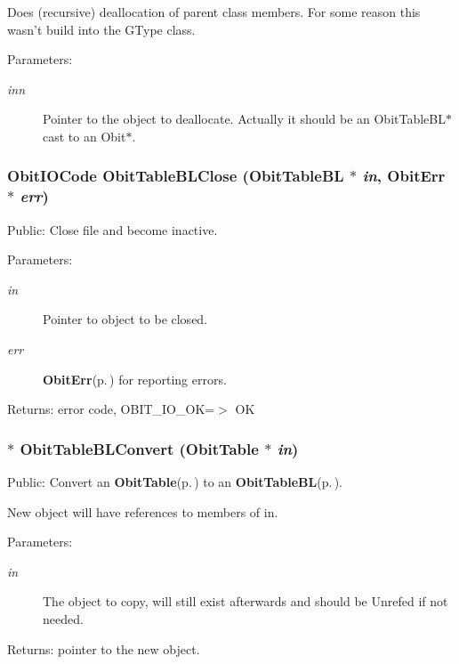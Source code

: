 Does (recursive) deallocation of parent class members. For some reason this wasn't build into the GType class. \begin{Desc}
\item[Parameters:]
\begin{description}
\item[{\em inn}]Pointer to the object to deallocate. Actually it should be an Obit\-Table\-BL$\ast$ cast to an Obit$\ast$. \end{description}
\end{Desc}
\subsubsection{\setlength{\rightskip}{0pt plus 5cm}Obit\-IOCode Obit\-Table\-BLClose ({\bf Obit\-Table\-BL} $\ast$ {\em in}, {\bf Obit\-Err} $\ast$ {\em err})}\label{ObitTableBL_8c_a25}


Public: Close file and become inactive. 

\begin{Desc}
\item[Parameters:]
\begin{description}
\item[{\em in}]Pointer to object to be closed. \item[{\em err}]{\bf Obit\-Err}{\rm (p.\,\pageref{structObitErr})} for reporting errors. \end{description}
\end{Desc}
\begin{Desc}
\item[Returns:]error code, OBIT\_\-IO\_\-OK=$>$ OK \end{Desc}
\subsubsection{$\ast$ Obit\-Table\-BLConvert ({\bf Obit\-Table} $\ast$ {\em in})}\label{ObitTableBL_8c_a19}


Public: Convert an {\bf Obit\-Table}{\rm (p.\,\pageref{structObitTable})} to an {\bf Obit\-Table\-BL}{\rm (p.\,\pageref{structObitTableBL})}. 

New object will have references to members of in. \begin{Desc}
\item[Parameters:]
\begin{description}
\item[{\em in}]The object to copy, will still exist afterwards and should be Unrefed if not needed. \end{description}
\end{Desc}
\begin{Desc}
\item[Returns:]pointer to the new object. \end{Desc}
